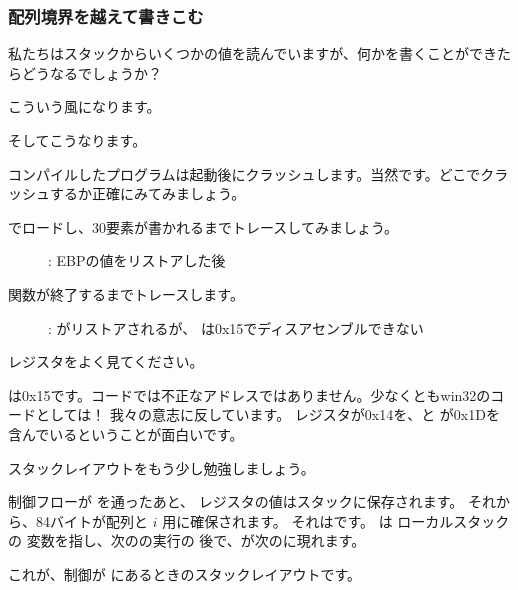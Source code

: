 ﻿\subsubsection{配列境界を越えて書きこむ}

私たちはスタックからいくつかの値を読んでいますが、何かを書くことができたらどうなるでしょうか？

こういう風になります。




そしてこうなります。



コンパイルしたプログラムは起動後にクラッシュします。当然です。どこでクラッシュするか正確にみてみましょう。

\clearpage
\myindex{\olly}

\olly でロードし、30要素が書かれるまでトレースしてみましょう。

\begin{figure}[H]
\centering
{}
\caption{\olly: EBPの値をリストアした後}
\label{fig:array_BO_olly_w1}
\end{figure}

\clearpage
関数が終了するまでトレースします。

\begin{figure}[H]
\centering
{}
\caption{\olly: 
 がリストアされるが、 \olly は0x15でディスアセンブルできない}
\label{fig:array_BO_olly_w2}
\end{figure}

レジスタをよく見てください。

\EIP は0x15です。コードでは不正なアドレスではありません。少なくともwin32のコードとしては！
我々の意志に反しています。
\EBP レジスタが0x14を、\ECX と \EDX が0x1Dを含んでいるということが面白いです。

スタックレイアウトをもう少し勉強しましょう。

制御フローが \TT{\main} を通ったあと、 \EBP レジスタの値はスタックに保存されます。
それから、84バイトが配列と $i$ 用に確保されます。
それはです。
\ESP は ローカルスタックの  変数を指し、次のの実行の
後で、が次のに現れます。

これが、制御が \main にあるときのスタックレイアウトです。

